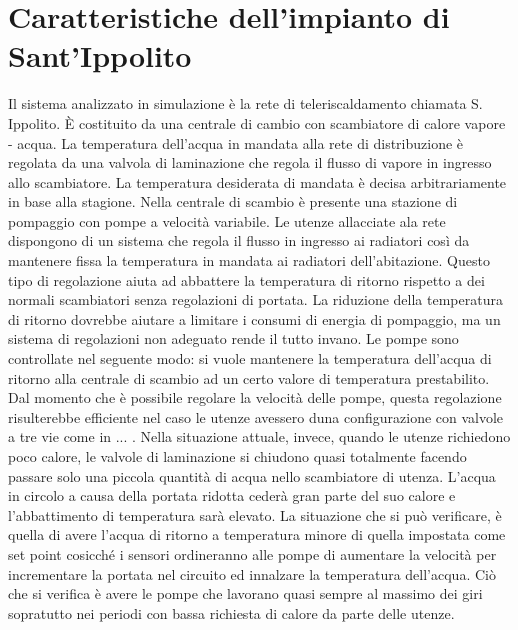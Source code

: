 \documentclass[laurea,oneside,11pt]{USiena_tesiLM}
\begin{document}
\section{Caratteristiche dell'impianto di Sant'Ippolito}
Il sistema analizzato in simulazione è la rete di teleriscaldamento chiamata S. Ippolito. \`E costituito da una centrale di cambio con scambiatore di calore vapore - acqua. La temperatura dell'acqua in mandata alla rete di distribuzione è regolata da una valvola di laminazione che regola il flusso di vapore in ingresso allo scambiatore. La temperatura desiderata di mandata è decisa arbitrariamente in base alla stagione. Nella centrale di scambio è presente una stazione di pompaggio con pompe a velocità variabile.
Le utenze allacciate ala rete dispongono di un sistema che regola il flusso in ingresso ai radiatori così da mantenere fissa la temperatura in mandata ai radiatori dell'abitazione. Questo tipo di regolazione aiuta ad abbattere la temperatura di ritorno rispetto a dei normali  scambiatori senza regolazioni di portata. La riduzione della temperatura di ritorno dovrebbe aiutare a limitare i consumi di energia di pompaggio, ma un sistema di regolazioni non adeguato rende il tutto invano. Le pompe sono controllate nel seguente modo: si vuole mantenere la temperatura dell'acqua di ritorno alla centrale di scambio ad un certo valore di temperatura prestabilito. Dal momento che è possibile regolare la velocità delle pompe, questa regolazione   risulterebbe efficiente nel caso le utenze avessero duna configurazione con valvole a tre vie come in ... . Nella situazione attuale, invece, quando le utenze richiedono poco calore, le valvole di laminazione si chiudono quasi totalmente facendo passare solo una piccola quantità di acqua nello scambiatore di utenza. L'acqua in circolo a causa della portata ridotta cederà gran parte del suo calore e l'abbattimento di temperatura sarà elevato. La situazione che si può verificare, è quella di avere l'acqua di ritorno a temperatura minore di quella impostata come set point cosicché i sensori ordineranno alle pompe di aumentare la velocità per incrementare la portata  nel circuito ed innalzare la temperatura dell'acqua. Ciò che si verifica è avere le pompe che lavorano quasi sempre al massimo dei giri sopratutto nei periodi con bassa richiesta di calore da parte delle utenze.
\end{document}
